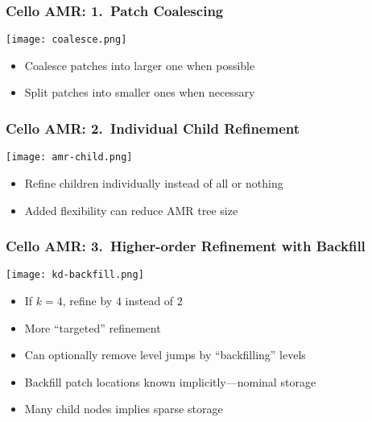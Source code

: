 \begin{frame}[fragile] \frametitle{Cello AMR: 1.~Patch Coalescing}
\centerline{\texttt{[image: coalesce.png]}}
\begin{itemize}
\item Coalesce patches into larger one when possible
\item Split patches into smaller ones when necessary
\end{itemize}
\end{frame}

\begin{frame}[fragile] \frametitle{Cello AMR: 2.~Individual Child Refinement}
\centerline{\texttt{[image: amr-child.png]}}
\begin{itemize}
\item Refine children individually instead of all or nothing
\item Added flexibility can reduce AMR tree size
\end{itemize}
\end{frame}

\begin{frame}[fragile] \frametitle{Cello AMR: 3.~Higher-order Refinement with Backfill}
\centerline{\texttt{[image: kd-backfill.png]}}
\begin{itemize}
\item If $k=4$, refine by $4$ instead of $2$
\item More ``targeted'' refinement
\item Can optionally remove level jumps by ``backfilling'' levels
\item Backfill patch locations known implicitly---nominal storage
\item Many child nodes implies sparse storage
\end{itemize}
\end{frame}
